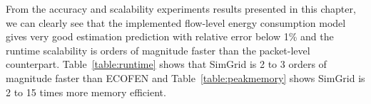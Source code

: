
From the accuracy and scalability experiments results presented in this chapter, we can clearly see that the implemented flow-level energy consumption model gives very good estimation prediction with relative error below 1\% and the runtime scalability is orders of magnitude faster than the packet-level counterpart. Table~\ref{table:runtime} shows that SimGrid is 2 to 3 orders of magnitude faster than ECOFEN and Table~\ref{table:peakmemory} shows SimGrid is 2 to 15 times more memory efficient. 

